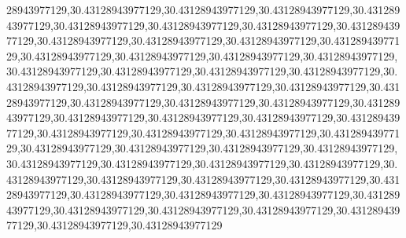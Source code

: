 28943977129,30.43128943977129,30.43128943977129,30.43128943977129,30.43128943977129,30.43128943977129,30.43128943977129,30.43128943977129,30.43128943977129,30.43128943977129,30.43128943977129,30.43128943977129,30.43128943977129,30.43128943977129,30.43128943977129,30.43128943977129,30.43128943977129,30.43128943977129,30.43128943977129,30.43128943977129,30.43128943977129,30.43128943977129,30.43128943977129,30.43128943977129,30.43128943977129,30.43128943977129,30.43128943977129,30.43128943977129,30.43128943977129,30.43128943977129,30.43128943977129,30.43128943977129,30.43128943977129,30.43128943977129,30.43128943977129,30.43128943977129,30.43128943977129,30.43128943977129,30.43128943977129,30.43128943977129,30.43128943977129,30.43128943977129,30.43128943977129,30.43128943977129,30.43128943977129,30.43128943977129,30.43128943977129,30.43128943977129,30.43128943977129,30.43128943977129,30.43128943977129,30.43128943977129,30.43128943977129,30.43128943977129,30.43128943977129,30.43128943977129,30.43128943977129,30.43128943977129,30.43128943977129,30.43128943977129,30.43128943977129
